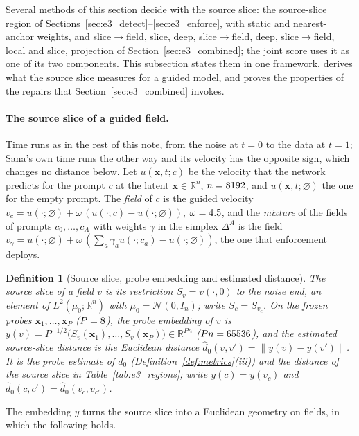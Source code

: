 \documentclass{article}
\newcommand{\RR}{\mathbb{R}}
\newcommand{\cN}{\mathcal{N}}
\newcommand{\bx}{\mathbf{x}}
\theoremstyle{plain}
\newtheorem{definition}[theorem]{Definition}
\theoremstyle{remark}
\begin{document}
Several methods of this section decide with the source slice: the source-slice region of
Sections~\ref{sec:e3_detect}--\ref{sec:e3_enforce}, with static and nearest-anchor weights, and slice$\to$field, slice, deep,
slice$\to$field, deep, slice$\to$field, local and slice, projection of Section~\ref{sec:e3_combined}; the joint score uses it as one of
its two components. This subsection states them in one framework, derives what the source slice measures for a guided model, and
proves the properties of the repairs that Section~\ref{sec:e3_combined} invokes.

\paragraph{The source slice of a guided field.}
Time runs as in the rest of this note, from the noise at $t=0$ to the data at $t=1$; Sana's own time runs the other way and its
velocity has the opposite sign, which changes no distance below. Let $u(\bx,t;c)$ be the velocity that the network predicts for the
prompt $c$ at the latent $\bx\in\RR^n$, $n=8192$, and $u(\bx,t;\varnothing)$ the one for the empty prompt. The \emph{field}
of $c$ is the guided velocity $v_c=u(\cdot;\varnothing)+\omega\,(u(\cdot;c)-u(\cdot;\varnothing))$, $\omega=4.5$, and the
\emph{mixture} of the fields of prompts $c_0,\dots,c_A$ with weights $\gamma$ in the simplex $\Delta^A$ is the field
$v_\gamma=u(\cdot;\varnothing)+\omega\,(\sum_a\gamma_au(\cdot;c_a)-u(\cdot;\varnothing))$, the one that enforcement deploys.

\begin{definition}[Source slice, probe embedding and estimated distance]\label{def:slice_e3}
The \emph{source slice} of a field $v$ is its restriction $S_v=v(\cdot,0)$ to the noise end, an element of $L^2(\mu_0;\RR^n)$ with
$\mu_0=\cN(0,I_n)$; write $S_c=S_{v_c}$. On the frozen probes $\bx_1,\dots,\bx_P$ ($P=8$), the \emph{probe embedding} of $v$ is
$y(v)=P^{-1/2}\big(S_v(\bx_1),\dots,S_v(\bx_P)\big)\in\RR^{Pn}$ ($Pn=65536$), and the \emph{estimated source-slice distance} is the
Euclidean distance $\hat d_0(v,v')=\|y(v)-y(v')\|$. It is the probe estimate of $d_0$ (Definition~\ref{def:metrics}(iii)) and the
distance of the source slice in Table~\ref{tab:e3_regions}; write $y(c)=y(v_c)$ and $\hat d_0(c,c')=\hat d_0(v_c,v_{c'})$.
\end{definition}

The embedding $y$ turns the source slice into a Euclidean geometry on fields, in which the following holds.
\end{document}
